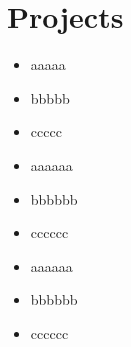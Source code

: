 \documentclass{resume}
\begin{document}
\section{Projects}
\begin{itemize}
\item{aaaaa}
\item{bbbbb}
\item{ccccc}
\end{itemize}
\begin{itemize}
\item{aaaaaa}
\item{bbbbbb}
\item{cccccc}
\end{itemize}
\begin{itemize}
\item{aaaaaa}
\item{bbbbbb}
\item{cccccc}
\end{itemize}
\end{document}
